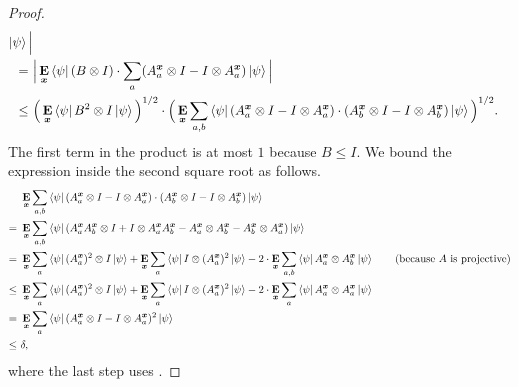 \begin{proof}
\begin{align*}
    \ket{\psi}\Big|\\
    =~&\Big|\mathop{\bf E\/}_{{\boldsymbol{x}}} \bra{\psi} (B\otimes I)\cdot \sum_a ( A^{{\boldsymbol{x}}}_a \otimes I - I \otimes A^{{\boldsymbol{x}}}_a )
    \ket{\psi}\Big|\\
    \leq~& \Big( \mathop{\bf E\/}_{{\boldsymbol{x}}} \bra{\psi} B^2 \otimes I \ket{\psi} \Big)^{1/2}
    \cdot \Big( \mathop{\bf E\/}_{{\boldsymbol{x}}} \sum_{a,b} \bra{\psi}
    (A^{{\boldsymbol{x}}}_a \otimes I - I \otimes A^{{\boldsymbol{x}}}_a) \cdot(A^{{\boldsymbol{x}}}_b \otimes I
    - I \otimes A^{{\boldsymbol{x}}}_b) \ket{\psi} \Big)^{1/2}.
  \end{align*}
  The first term in the product is at most $1$ because $B \leq I$.
  We bound the expression inside the second square root as follows.
  \begin{align*}
    &\mathop{\bf E\/}_{{\boldsymbol{x}}} \sum_{a,b} \bra{\psi}    (A^{{\boldsymbol{x}}}_a \otimes I - I \otimes A^{{\boldsymbol{x}}}_a) \cdot(A^{{\boldsymbol{x}}}_b \otimes I
    - I \otimes A^{{\boldsymbol{x}}}_b) \ket{\psi}  \\
    =~&\mathop{\bf E\/}_{{\boldsymbol{x}}} \sum_{a, b} \bra{\psi}(A^{{\boldsymbol{x}}}_a A^{{\boldsymbol{x}}}_b \otimes I + I \otimes A^{{\boldsymbol{x}}}_a A^{{\boldsymbol{x}}}_b - A^{{\boldsymbol{x}}}_a \otimes A^{{\boldsymbol{x}}}_b - A^{{\boldsymbol{x}}}_b \otimes A^{{\boldsymbol{x}}}_a)\ket{\psi}\\
    =~& \mathop{\bf E\/}_{{\boldsymbol{x}}}\sum_a
                                                \bra{\psi} (A^{{\boldsymbol{x}}}_a)^2
                                                \otimes I \ket{\psi} +
                                                 \mathop{\bf E\/}_{{\boldsymbol{x}}}\sum_a
                                                \bra{\psi} I \otimes (A^{{\boldsymbol{x}}}_a)^2 \ket{\psi} -
                                                 2\cdot\mathop{\bf E\/}_{{\boldsymbol{x}}} \sum_{a,b} \bra{\psi}A^{{\boldsymbol{x}}}_a
                                                \otimes A^{{\boldsymbol{x}}}_b
                                                \ket{\psi} \tag{because~$A$ is projective}
                                                \\
    \leq~& \mathop{\bf E\/}_{{\boldsymbol{x}}}\sum_a
                                                \bra{\psi} (A^{{\boldsymbol{x}}}_a)^2
                                                \otimes I \ket{\psi} +
                                                 \mathop{\bf E\/}_{{\boldsymbol{x}}}\sum_a
                                                \bra{\psi} I \otimes (A^{{\boldsymbol{x}}}_a)^2 \ket{\psi} -
                                                 2\cdot\mathop{\bf E\/}_{{\boldsymbol{x}}} \sum_{a} \bra{\psi}A^{{\boldsymbol{x}}}_a
                                                \otimes A^{{\boldsymbol{x}}}_a
                                                \ket{\psi}
                                                \\
       =~& \mathop{\bf E\/}_{{\boldsymbol{x}}}\sum_a
                                                \bra{\psi} (A^{{\boldsymbol{x}}}_a
                                                \otimes I  - I \otimes A^{{\boldsymbol{x}}}_a)^2
                                                \ket{\psi}
       \\
   \leq~& \delta,
  \end{align*}
  where the last step uses .
\end{proof}

